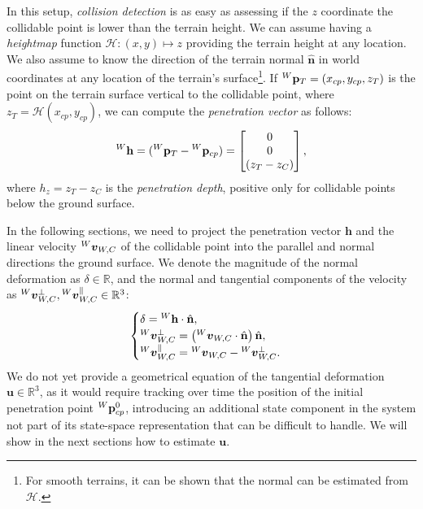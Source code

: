 In this setup, \emph{collision detection} is as easy as assessing if the $z$ coordinate the collidable point is lower than the terrain height.
We can assume having a \emph{heightmap} function $\mathcal{H}: (x, y) \mapsto z$ providing the terrain height at any location.
We also assume to know the direction of the terrain normal $\hat{\mathbf{n}}$ in world coordinates at any location of the terrain's surface\footnote{For smooth terrains, it can be shown that the normal can be estimated from $\mathcal{H}$.}.
If $\pos[W]_T = (x_{cp}, y_{cp}, z_T)$ is the point on the terrain surface vertical to the collidable point, where $z_T = \mathcal{H}(x_{cp}, y_{cp})$,
we can compute the \emph{penetration vector} as follows:
%
\begin{equation*}
    {}^W\mathbf{h} = (\pos[W]_T - \pos[W]_{cp}) = 
    \begin{bmatrix}
    0 \\ 0 \\ (z_T - z_C)
    \end{bmatrix}
    ,
\end{equation*}
%
where $h_z = z_T - z_C$ is the \emph{penetration depth}, positive only for collidable points below the ground surface.

In the following sections, we need to project the penetration vector $\mathbf{h}$ and the linear velocity $\vellin[W]_{W, C}$ of the collidable point into the parallel and normal directions \wrt the ground surface.
We denote the magnitude of the normal deformation as $\delta \in \mathbb{R}$, and the normal and tangential components of the velocity as $\vellin[W]^{\perp}_{W, C}, \vellin[W]^{\parallel}_{W, C} \in \mathbb{R}^3$:
%
\begin{align*}
    \begin{cases}
        \delta = {}^W\mathbf{h} \cdot \hat{\mathbf{n}}, \\
        \vellin[W]^{\perp}_{W, C} = \left(\vellin[W]_{W, C} \cdot \hat{\mathbf{n}}\right) \hat{\mathbf{n}}, \\
    \vellin[W]^{\parallel}_{W, C} = \vellin[W]_{W, C} - \vellin[W]^{\perp}_{W, C}
    .
    \end{cases}
\end{align*}
%
We do not yet provide a geometrical equation of the tangential deformation $\mathbf{u} \in \mathbb{R}^3$, as it would require tracking over time the position of the initial penetration point $\pos[W]^0_{cp}$, introducing an additional state component in the system not part of its state-space representation that can be difficult to handle.
We will show in the next sections how to estimate $\mathbf{u}$.

